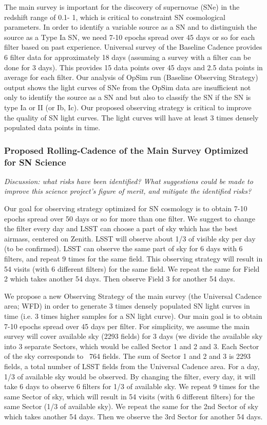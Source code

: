 The main survey is important for the discovery of supernovae (SNe) in the redshift range of
0.1- 1, which is critical to constraint SN cosmological parameters. In order to identify a
variable source as a SN and to distinguish the source as a Type Ia SN, we need 7-10 epochs
spread over 45 days or so for each filter based on past experience. Universal survey of
the Baseline Cadence provides 6 filter data for approximately 18 days (assuming a survey with
a filter can be done for 3 days). This provides 15 data points over 45 days and 2.5 data
points in average for each filter. Our analysis of OpSim run (Baseline Observing Strategy)
output shows the light curves of SNe from the OpSim data are insufficient not only to
identify the source as a SN and but also to classify the SN if the SN is type Ia or II (or
Ib, Ic). Our proposed observing strategy is critical to improve the quality of SN light
curves. The light curves will have at least 3 times densely populated data points in time. 

\subsubsection{Proposed Rolling-Cadence of the Main Survey Optimized for SN Science }


{\it Discussion: what risks have been identified? What suggestions could be
made to improve this science project's figure of merit, and mitigate
the identified risks?}

Our goal for observing strategy optimized for SN cosmology is to
obtain 7-10 epochs spread over 50 days or so for more than one filter. We suggest to
change the filter every day and LSST can choose a part of sky which has the best airmass,
centered on Zenith. LSST will observe about 1/3 of visible sky per day (to be confirmed).
LSST can observe the same part of sky for 6 days with 6 filters, and repeat 9 times for
the same field. This observing strategy will result in 54 visits (with 6 different
filters) for the same field. We repeat the same for Field 2 which takes another 54 days.
Then observe Field 3 for another 54 days.

We propose a new Observing Strategy of the main survey (the Universal Cadence area;
WFD) in order to generate 3 times densely populated SN light curves in time (i.e. 3
times higher samples for a SN light curve). Our main goal is to obtain 7-10 epochs
spread over 45 days per filter. For simplicity, we assume the main survey will cover
available sky (2293 fields) for 3 days (we divide the available sky into 3 separate
Sectors, which would be called Sector 1 and 2 and 3. Each Sector of the sky
corresponds to ~764 fields. The sum of Sector 1 and 2 and 3 is 2293 fields, a total
number of LSST fields from the Universal Cadence area. For a day, 1/3 of available
sky would be observed. By changing the filter, every day, it will take 6 days to
observe 6 filters for 1/3 of available sky. We repeat 9 times for the same Sector of
sky, which will result in 54 visits (with 6 different filters) for the same Sector
(1/3 of available sky). We repeat the same for the 2nd Sector of sky which takes
another 54 days. Then we observe the 3rd Sector for another 54 days.

